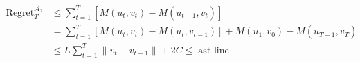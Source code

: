 \documentclass{article}
\begin{document}
\begin{align}
\text{Regret}^{\mathcal A_2}_T 
& \le \sum_{t=1}^T \left[ M(u_t,v_t) - M(u_{t+1},v_t)  \right] 
\\ \nonumber
& = \sum_{t=1}^{T} \left[ M(u_t, v_t) - M(u_t,v_{t-1}) \right] + M(u_{1},v_0)- M(u_{T+1},v_{T}) 
\\ \nonumber
& \le L \sum_{t=1}^T  \| v_{t} - v_{t-1} \| + 2C \le \text{last line}
\end{align}
\end{document}
